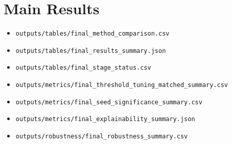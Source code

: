 \section{Main Results}


\begin{itemize}
\item \texttt{outputs/tables/final\_method\_comparison.csv}
\item \texttt{outputs/tables/final\_results\_summary.json}
\item \texttt{outputs/tables/final\_stage\_status.csv}
\item \texttt{outputs/metrics/final\_threshold\_tuning\_matched\_summary.csv}
\item \texttt{outputs/metrics/final\_seed\_significance\_summary.csv}
\item \texttt{outputs/metrics/final\_explainability\_summary.json}
\item \texttt{outputs/robustness/final\_robustness\_summary.csv}
\end{itemize}

